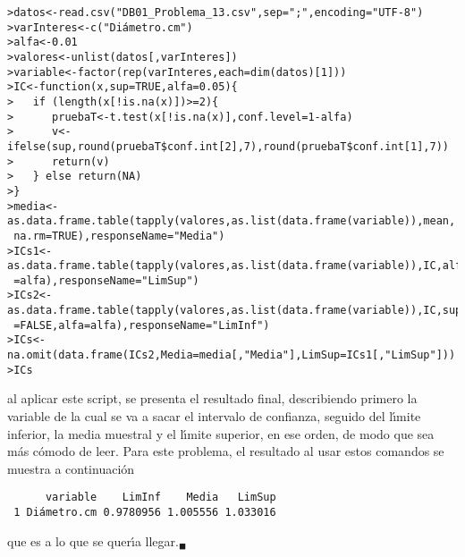 \begin{solucion}
 \begin{verbatim}
>datos<-read.csv("DB01_Problema_13.csv",sep=";",encoding="UTF-8")
>varInteres<-c("Diámetro.cm")
>alfa<-0.01
>valores<-unlist(datos[,varInteres])
>variable<-factor(rep(varInteres,each=dim(datos)[1]))
>IC<-function(x,sup=TRUE,alfa=0.05){
>   if (length(x[!is.na(x)])>=2){
>      pruebaT<-t.test(x[!is.na(x)],conf.level=1-alfa)
>      v<-ifelse(sup,round(pruebaT$conf.int[2],7),round(pruebaT$conf.int[1],7))
>      return(v)
>   } else return(NA)
>}
>media<-as.data.frame.table(tapply(valores,as.list(data.frame(variable)),mean,
 na.rm=TRUE),responseName="Media")
>ICs1<-as.data.frame.table(tapply(valores,as.list(data.frame(variable)),IC,alfa
 =alfa),responseName="LimSup")
>ICs2<-as.data.frame.table(tapply(valores,as.list(data.frame(variable)),IC,sup
 =FALSE,alfa=alfa),responseName="LimInf")
>ICs<-na.omit(data.frame(ICs2,Media=media[,"Media"],LimSup=ICs1[,"LimSup"]))
>ICs
 \end{verbatim}
 \vspace{-0.5cm}
 al aplicar este script, se presenta el resultado final, describiendo primero la variable de la cual se va a sacar el intervalo de confianza, seguido del l\'{\i}mite inferior, la media muestral y el l\'{\i}mite superior, en ese orden, de modo que sea m\'as c\'omodo de leer. Para este problema, el resultado al usar estos comandos se muestra a continuaci\'on
 \begin{verbatim}
      variable    LimInf    Media   LimSup
 1 Diámetro.cm 0.9780956 1.005556 1.033016
 \end{verbatim}
 \vspace{-0.5cm}
 que es a lo que se quer\'{\i}a llegar.${}_{\blacksquare}$
\end{solucion}
